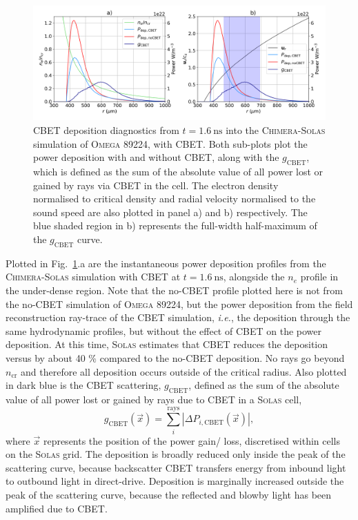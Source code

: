 \begin{figure}[t!]
    \includegraphics[width=\linewidth]{Numerics/Images/89224_it160_pdepcbet.png}
    \centering
    \caption{\ac{CBET} deposition diagnostics from $t=1.6\ \text{ns}$ into the \textsc{Chimera}-\textsc{Solas} simulation of \textsc{Omega} 89224, with \ac{CBET}.
    Both sub-plots plot the power deposition with and without \ac{CBET}, along with the $g_{\text{CBET}}$, which is defined as the sum of the absolute value of all power lost or gained by rays via \ac{CBET} in the cell.
    The electron density normalised to critical density and radial velocity normalised to the sound speed are also plotted in panel a) and b) respectively.
    The blue shaded region in b) represents the full-width half-maximum of the $g_{\text{CBET}}$ curve.}%
    \label{fig:SOLAS_89224_pdep}
\end{figure}

Plotted in Fig.~\ref{fig:SOLAS_89224_pdep}.a are the instantaneous power deposition profiles from the \textsc{Chimera}-\textsc{Solas} simulation with \ac{CBET} at $t=1.6\ \text{ns}$, alongside the $n_e$ profile in the under-dense region.
Note that the no-\ac{CBET} profile plotted here is not from the no-\ac{CBET} simulation of \textsc{Omega} 89224, but the power deposition from the field reconstruction ray-trace of the \ac{CBET} simulation, \textit{i.e.}, the deposition through the same hydrodynamic profiles, but without the effect of \ac{CBET} on the power deposition.
At this time, \textsc{Solas} estimates that \ac{CBET} reduces the deposition versus by about 40 \% compared to the no-\ac{CBET} deposition.
No rays go beyond $n_{\text{cr}}$ and therefore all deposition occurs outside of the critical radius.
Also plotted in dark blue is the \ac{CBET} scattering, $g_{\text{CBET}}$, defined as the sum of the absolute value of all power lost or gained by rays due to \ac{CBET} in a \textsc{Solas} cell,
\begin{equation}
    \label{sec:res1_cbet_scattering}
    g_{\text{CBET}}(\vec{x}) = \sum_{i}^{\text{rays}} \left| \Delta P_{i,\text{CBET}}(\vec{x}) \right|,
\end{equation}
where $\vec{x}$ represents the position of the power gain/ loss, discretised within cells on the \textsc{Solas} grid.
The deposition is broadly reduced only inside the peak of the scattering curve, because backscatter \ac{CBET} transfers energy from inbound light to outbound light in direct-drive.
Deposition is marginally increased outside the peak of the scattering curve, because the reflected and blowby light has been amplified due to \ac{CBET}.

